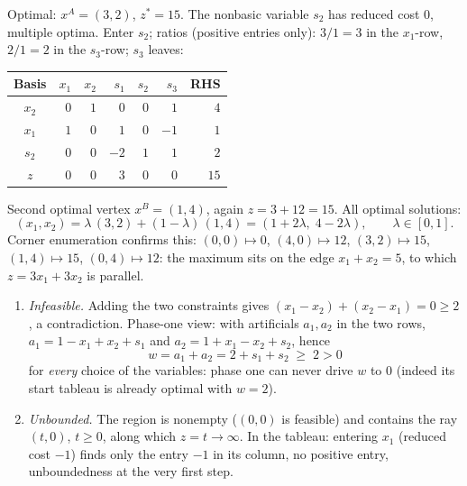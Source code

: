 \begin{solutions}
\begin{center}
\begin{tabular}{c|rrrrr|r}
        \hline
        \end{tabular}
        \end{center}
        Optimal: $x^{A}=(3,2)$, $z^{*}=15$. The nonbasic variable $s_2$
        has reduced cost $0$, multiple optima. Enter $s_2$; ratios
        (positive entries only): $3/1=3$ in the $x_1$-row, $2/1=2$ in the
        $s_3$-row; $s_3$ leaves:
        \begin{center}
        \begin{tabular}{c|rrrrr|r}
        \hline
        Basis & $x_1$ & $x_2$ & $s_1$ & $s_2$ & $s_3$ & RHS\\
        \hline
        $x_2$ & $0$ & $1$ & $0$ & $0$ & $1$ & $4$\\
        $x_1$ & $1$ & $0$ & $1$ & $0$ & $-1$ & $1$\\
        $s_2$ & $0$ & $0$ & $-2$ & $1$ & $1$ & $2$\\
        \hline
        $z$ & $0$ & $0$ & $3$ & $0$ & $0$ & $15$\\
        \hline
        \end{tabular}
        \end{center}
        Second optimal vertex $x^{B}=(1,4)$, again $z=3+12=15$. All
        optimal solutions:
        \[
          (x_1,x_2)=\lambda\,(3,2)+(1-\lambda)\,(1,4)
                   =(1+2\lambda,\;4-2\lambda),\qquad\lambda\in[0,1].
        \]
        Corner enumeration confirms this: $(0,0)\mapsto 0$,
        $(4,0)\mapsto 12$, $(3,2)\mapsto 15$, $(1,4)\mapsto 15$,
        $(0,4)\mapsto 12$: the maximum sits on the edge
        $x_1+x_2=5$, to which $z=3x_1+3x_2$ is parallel.

  \item
        \begin{enumerate}[label=(\alph*),leftmargin=1.8em,itemsep=0.5ex]
          \item \emph{Infeasible.} Adding the two constraints gives
                $(x_1-x_2)+(x_2-x_1)=0\ge 2$, a contradiction. Phase-one
                view: with artificials $a_1,a_2$ in the two rows,
                $a_1=1-x_1+x_2+s_1$ and $a_2=1+x_1-x_2+s_2$, hence
                \[
                  w=a_1+a_2=2+s_1+s_2\;\ge\;2>0
                \]
                for \emph{every} choice of the variables: phase one can
                never drive $w$ to $0$ (indeed its start tableau is
                already optimal with $w=2$).
          \item \emph{Unbounded.} The region is nonempty ($(0,0)$ is
                feasible) and contains the ray $(t,0)$, $t\ge 0$, along
                which $z=t\to\infty$. In the tableau: entering $x_1$
                (reduced cost $-1$) finds only the entry $-1$ in its
                column, no positive entry, unboundedness at the very
                first step.
        \end{enumerate}
\end{solutions}

